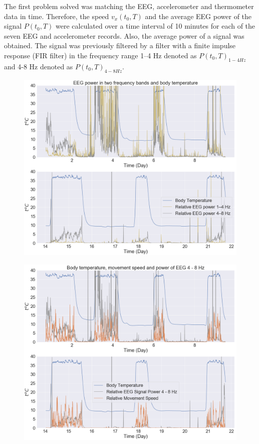 \documentclass[14pt,a4paper]{scrartcl}
\begin{document}
The first problem solved was matching the EEG, accelerometer and thermometer data in time. Therefore, the speed $ v_{x}(t_0, T) $ and the average EEG power of the signal $ P (t_0, T) $ were calculated over a time interval of 10 minutes for each of the seven EEG and accelerometer records. Also, the average power of a signal was obtained. The signal was previously filtered by a filter with a finite impulse response (FIR filter) in the frequency range 1–4 Hz denoted as $P(t_0, T)_{1-4Hz}$ and 4-8 Hz denoted as $ P(t_0, T)_{4-8Hz} $. 

\begin{figure}[H]
\centering
\begin{minipage}{.5\textwidth}
  \centering
  \includegraphics[width=\textwidth]{exp1_3.png}
  \label{fig:exp1_3}
\end{minipage}%
\begin{minipage}{.5\textwidth}
  \centering
  \includegraphics[width=\textwidth]{exp1_4.png}

\end{minipage}
\end{figure}
\end{document}
